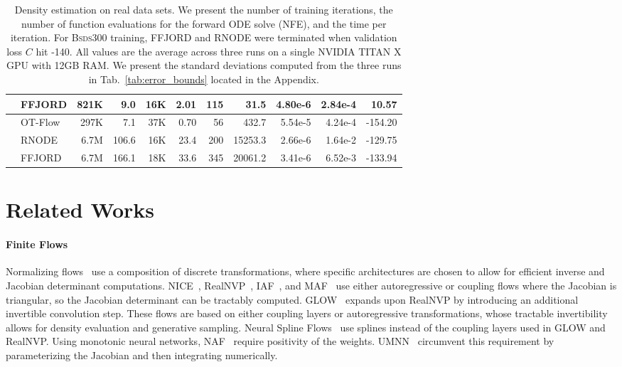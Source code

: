 \documentclass[letterpaper]{article}
\newcommand{\bsds}{\textsc{Bsds300}}
\newcommand{\model}{OT-Flow} %
\begin{document}
\begin{table*}[t]
\begin{tabular}{clrrrrrrrrr}
       	& FFJORD & 821K & 9.0 & 16K & 2.01 & 115 & 31.5 & 4.80e-6  & 2.84e-4 & 10.57\\
    \midrule
    \multirow{3}{*}{\shortstack[*]{\textbf{\bsds{}}\\$d=$ 63}} & 
    	\model{} &  297K & 7.1   &  37K & 0.70 & 56   & 432.7   & 5.54e-5 & 4.24e-4 & -154.20\\
        & RNODE  & 6.7M  & 106.6 &  16K & 23.4 & 200  & 15253.3 & 2.66e-6 & 1.64e-2 & -129.75\\ 
        & FFJORD & 6.7M  & 166.1 &  18K & 33.6 & 345  & 20061.2 & 3.41e-6 & 6.52e-3 & -133.94\\      
    \bottomrule
    \end{tabular}
	\caption{Density estimation on real data sets.
	We present the number of training iterations, the number of function evaluations for the forward ODE solve (NFE), and the time per iteration. For \bsds{} training, FFJORD and RNODE were terminated when validation loss $C$ hit -140. All values are the average across three runs on a single NVIDIA TITAN X GPU with 12GB RAM. We present the standard deviations computed from the three runs in Tab.~\ref{tab:error_bounds} located in the Appendix.} 
	\label{tab:large}
\end{table*}%




\section{Related Works}
\label{sec:relatedWorks}
	
	\paragraph{Finite Flows} 
	Normalizing flows~\cite{tabak2013family,rezende2015,papamakarios2019normalizing,kobyzev2019normalizing} use a composition of discrete transformations, where specific architectures are chosen to allow for efficient inverse and Jacobian determinant computations. 
	NICE~\cite{dinh2014nice}, RealNVP~\cite{dinh2016density}, IAF~\cite{kingma2016improved}, and MAF~\cite{papamakarios2017masked} use either autoregressive or coupling flows where the Jacobian is triangular, so the Jacobian determinant can be tractably computed. GLOW~\cite{kingma2018glow} expands upon RealNVP by introducing an additional invertible convolution step. 
	These flows are based on either coupling layers or autoregressive transformations, whose tractable invertibility allows for density evaluation and generative sampling.
	Neural Spline Flows~\cite{durkan2019neural} use splines instead of the coupling layers used in GLOW and RealNVP. Using monotonic neural networks, NAF~\cite{huang2018neural} require positivity of the weights. UMNN~\cite{wehenkel2019unconstrained} circumvent this requirement by parameterizing the Jacobian and then integrating numerically.
\end{document}
